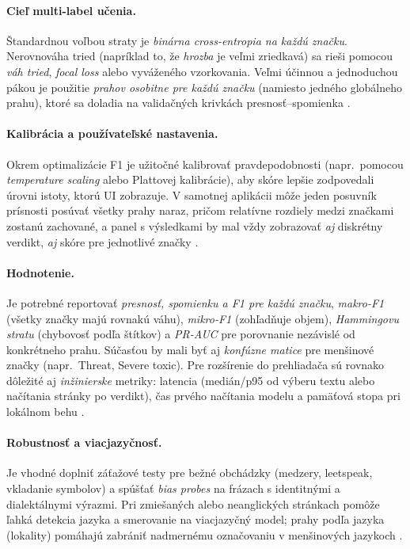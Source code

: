 \paragraph{Cieľ multi-label učenia.}
Štandardnou voľbou straty je \emph{binárna cross-entropia na každú značku}. Nerovnováha tried (napríklad to, že \emph{hrozba} je veľmi zriedkavá) sa rieši pomocou \emph{váh tried}, \emph{focal loss} alebo vyváženého vzorkovania. Veľmi účinnou a jednoduchou pákou je použitie \emph{prahov osobitne pre každú značku} (namiesto jedného globálneho prahu), ktoré sa doladia na validačných krivkách presnosť--spomienka \cite{tsoumakas2007multilabel}\cite{jigsaw2019bias}\cite{focalloss2017}\cite{sklearnPRCurve}.

\paragraph{Kalibrácia a používateľské nastavenia.}
Okrem optimalizácie F1 je užitočné kalibrovať pravdepodobnosti (napr.\ pomocou \emph{temperature scaling} alebo Plattovej kalibrácie), aby skóre lepšie zodpovedali úrovni istoty, ktorú UI zobrazuje. V samotnej aplikácii môže jeden posuvník prísnosti posúvať všetky prahy naraz, pričom relatívne rozdiely medzi značkami zostanú zachované, a panel s výsledkami by mal vždy zobrazovať \emph{aj} diskrétny verdikt, \emph{aj} skóre pre jednotlivé značky \cite{guo2017calibration}.

\paragraph{Hodnotenie.}
Je potrebné reportovať \emph{presnosť, spomienku a F1 pre každú značku}, \emph{makro-F1} (všetky značky majú rovnakú váhu), \emph{mikro-F1} (zohľadňuje objem), \emph{Hammingovu stratu} (chybovosť podľa štítkov) a \emph{PR-AUC} pre porovnanie nezávislé od konkrétneho prahu. Súčasťou by mali byť aj \emph{konfúzne matice} pre menšinové značky (napr.\ Threat, Severe toxic). Pre rozšírenie do prehliadača sú rovnako dôležité aj \emph{inžinierske} metriky: latencia (medián/p95 od výberu textu alebo načítania stránky po verdikt), čas prvého načítania modelu a pamäťová stopa pri lokálnom behu \cite{tsoumakas2007multilabel}\cite{jigsaw2018toxic}\cite{jigsaw2019bias}\cite{tfjsToxicity}\cite{chromemv3}\cite{borkan2019nuanced}\cite{dixon2018bias}\cite{sklearnPRCurve}\cite{sklearnF1}\cite{sklearnHamming}.

\paragraph{Robustnosť a viacjazyčnosť.}
Je vhodné doplniť záťažové testy pre bežné obchádzky (medzery, leetspeak, vkladanie symbolov) a spúšťať \emph{bias probes} na frázach s identitnými a dialektálnymi výrazmi. Pri zmiešaných alebo neanglických stránkach pomôže ľahká detekcia jazyka a smerovanie na viacjazyčný model; prahy podľa jazyka (lokality) pomáhajú zabrániť nadmernému označovaniu v menšinových jazykoch \cite{jigsaw2020multilingual}\cite{borkan2019nuanced}\cite{sap2019racialbias}\cite{hatecheck2021}\cite{xlmr2020}.

